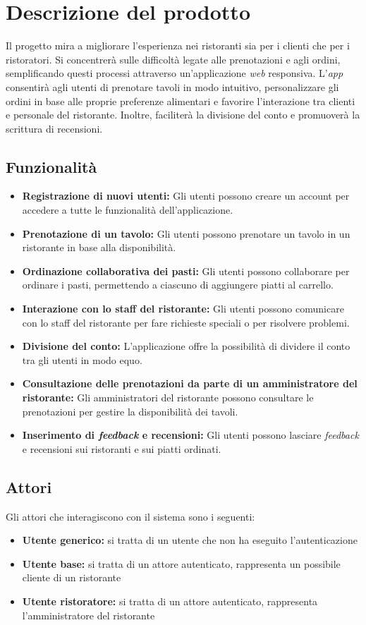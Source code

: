 \section{Descrizione del prodotto}
Il progetto mira a migliorare l'esperienza nei ristoranti sia per i clienti che per i ristoratori.
Si concentrerà sulle difficoltà legate alle prenotazioni e agli ordini, semplificando questi processi attraverso un'applicazione \textit{web} responsiva.
L'\textit{app} consentirà agli utenti di prenotare tavoli in modo intuitivo, personalizzare gli ordini in base alle proprie preferenze alimentari e favorire l'interazione tra clienti e personale del ristorante.
Inoltre, faciliterà la divisione del conto e promuoverà la scrittura di recensioni.

\subsection{Funzionalità}

\begin{itemize}
	\item \textbf{Registrazione di nuovi utenti:} Gli utenti possono creare un account per accedere a tutte le funzionalità dell'applicazione.
	\item \textbf{Prenotazione di un tavolo:} Gli utenti possono prenotare un tavolo in un ristorante in base alla disponibilità.
	\item \textbf{Ordinazione collaborativa dei pasti:} Gli utenti possono collaborare per ordinare i pasti, permettendo a ciascuno di aggiungere piatti al carrello.
	\item \textbf{Interazione con lo staff del ristorante:} Gli utenti possono comunicare con lo staff del ristorante per fare richieste speciali o per risolvere problemi.
	\item \textbf{Divisione del conto:} L'applicazione offre la possibilità di dividere il conto tra gli utenti in modo equo.
	\item \textbf{Consultazione delle prenotazioni da parte di un amministratore del ristorante:} Gli amministratori del ristorante possono consultare le prenotazioni per gestire la disponibilità dei tavoli.
	\item \textbf{Inserimento di \textit{feedback} e recensioni:} Gli utenti possono lasciare \textit{feedback} e recensioni sui ristoranti e sui piatti ordinati.
\end{itemize}

\subsection{Attori}
Gli attori che interagiscono con il sistema sono i seguenti:
\begin{itemize}
	\item \textbf{Utente generico:} si tratta di un utente che non ha eseguito l'autenticazione
	\item \textbf{Utente base:} si tratta di un attore autenticato, rappresenta un possibile cliente di un ristorante
	\item \textbf{Utente ristoratore:} si tratta di un attore autenticato, rappresenta l'amministratore del ristorante
\end{itemize}
